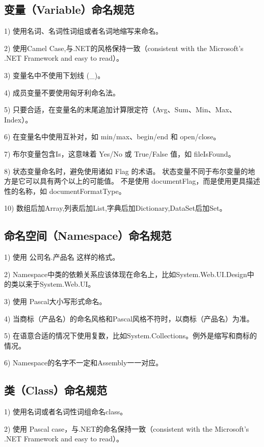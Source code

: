 \documentclass{book}
\begin{document}
\subsection{变量（Variable）命名规范}

1)  使用名词、名词性词组或者名词地缩写来命名。

2)  使用Camel Case,与.NET的风格保持一致（consistent with the Microsoft's .NET Framework and easy to read）。

3)  变量名中不使用下划线 (\_)。

4)  成员变量不要使用匈牙利命名法。

5)  只要合适，在变量名的末尾追加计算限定符（Avg、Sum、Min、Max、Index）。

6)  在变量名中使用互补对，如 min/max、begin/end 和 open/close。

7)  布尔变量包含Is，这意味着 Yes/No 或 True/False 值，如 fileIsFound。

8)  状态变量命名时，避免使用诸如 Flag 的术语。
状态变量不同于布尔变量的地方是它可以具有两个以上的可能值。
不是使用 documentFlag，而是使用更具描述性的名称，如 documentFormatType。

10) 数组后加Array,列表后加List,字典后加Dictionary,DataSet后加Set。

\subsection{命名空间（Namespace）命名规范}

1)  使用 公司名.产品名 这样的格式。

2)  Namespace中类的依赖关系应该体现在命名上，比如System.Web.UI.Design中的类以来于System.Web.UI。

3)  使用 Pascal大小写形式命名。

4)  当商标（产品名）的命名风格和Pascal风格不符时，以商标（产品名）为准。

5)  在语意合适的情况下使用复数，比如System.Collections。例外是缩写和商标的情况。

6)  Namespace的名字不一定和Assembly一一对应。

\subsection{类（Class）命名规范}

1)  使用名词或者名词性词组命名class。

2)  使用 Pascal case，与.NET的命名保持一致（consistent with the Microsoft's .NET Framework and easy to read）。
\end{document}
